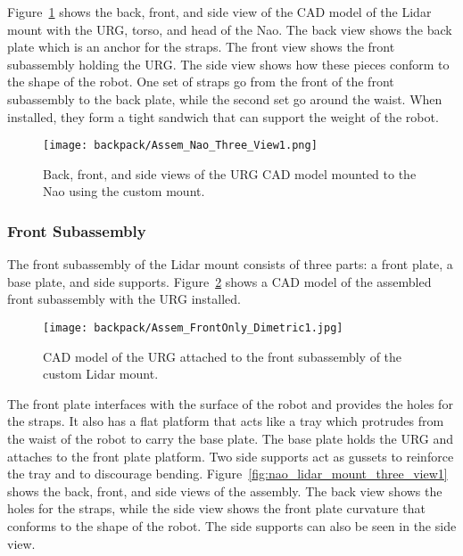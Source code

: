 Figure~\ref{fig:nao_lidar_mount_nao_three_view1} shows the back, front, and
side view of the CAD model of the Lidar mount with the URG, torso, and head of the
Nao. The back view shows the back plate which is an anchor for the straps.
The front view shows the front subassembly holding the URG\@. The side view
shows how these pieces conform to the shape of the robot. One set of straps
go from the front of the front subassembly to the back plate, while the second set
go around the waist. When installed, they form a tight sandwich that can support
the weight of the robot.

\begin{figure}
\centering
\texttt{[image: backpack/Assem\_Nao\_Three\_View1.png]}
\caption{Back, front, and side views of the URG CAD model 
         mounted to the Nao using the custom mount.}
\label{fig:nao_lidar_mount_nao_three_view1}
\end{figure}

\FloatBarrier

\subsubsection{Front Subassembly}
The front subassembly of the Lidar mount consists of three parts: a front plate,
a base plate, and side supports. Figure~\ref{fig:nao_lidar_mount_dimetric1}
shows a CAD model of the assembled front subassembly with the URG installed.

\begin{figure}[H]
\centering
\texttt{[image: backpack/Assem\_FrontOnly\_Dimetric1.jpg]}
\caption{CAD model of the URG attached to the front subassembly
         of the custom Lidar mount.}
\label{fig:nao_lidar_mount_dimetric1}
\end{figure}

The front plate interfaces with the surface of the robot and provides the
holes for the straps. It also has a flat platform that acts like a tray which protrudes from the
waist of the robot to carry the base plate. The base plate holds the URG
and attaches to the front plate platform. Two side supports act as gussets
to reinforce the tray and to discourage bending.
Figure~\ref{fig:nao_lidar_mount_three_view1} shows the back, front, and side
views of the assembly. The back view shows the holes for the straps, 
while the side view shows the front plate curvature that conforms
to the shape of the robot. The side supports can also be seen in the side view.

